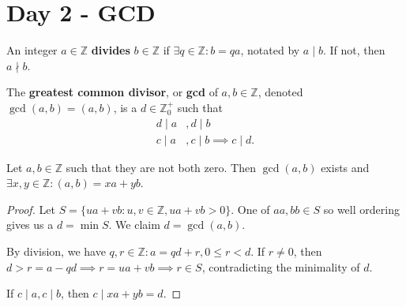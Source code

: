 \section{Day 2 - GCD}

\begin{df}
An integer $a \in \mathbb{Z}$ \textbf{divides} $b \in \mathbb{Z}$ if
$\exists q \in \mathbb{Z} : b = qa$, notated by $a \mid b$. If not, then
$a \nmid b$.
\end{df}

\begin{df}
The \textbf{greatest common divisor}, or \textbf{gcd} of $a, b \in
\mathbb{Z}$, denoted $\gcd(a, b) = (a, b)$, is a $d \in \mathbb{Z}_0^+$
such that
\[ \begin{aligned}
d \mid a&, d \mid b \\
c \mid a&, c \mid b \implies c \mid d.
\end{aligned} \]
\end{df}

\begin{thm}[Bezout]
Let $a, b \in \mathbb{Z}$ such that they are not both zero. Then
$\gcd(a, b)$ exists and $\exists x, y \in \mathbb{Z} : (a, b) = xa +
yb$.
\end{thm}

\begin{proof}
Let $S = \lbrace ua + vb : u, v \in \mathbb{Z}, ua + vb > 0 \rbrace$.
One of $aa, bb \in S$ so well ordering gives us a $d = \min S$. We claim
$d = \gcd(a, b)$.

By division, we have $q, r \in \mathbb{Z} : a = qd + r, 0 \leq r < d$.
If $r \neq 0$, then $d > r = a - qd \implies r = ua + vb \implies r \in
S$, contradicting the minimality of $d$.

If $c \mid a, c \mid b$, then $c \mid xa + yb = d$.
\end{proof}
